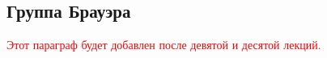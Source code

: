     \subsection{Группа Брауэра}

    \textcolor{red}{Этот параграф будет добавлен после девятой и десятой лекций. }
    
  	 












	  



	  












	  



	  

